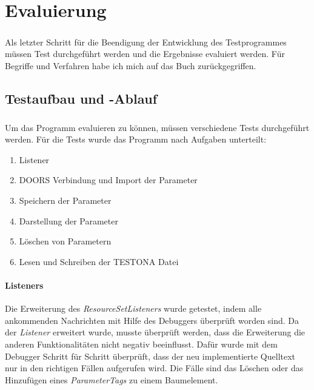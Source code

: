 \chapter{Evaluierung}\label{chp:Evaluierung}
\paragraph{}

Als letzter Schritt für die Beendigung der Entwicklung des Testprogrammes müssen Test durchgeführt werden und die Ergebnisse evaluiert werden. Für Begriffe und Verfahren habe ich mich auf das Buch \cite{TestenInfoSys} zurückgegriffen.


\newpage
\section{Testaufbau und -Ablauf} \label{sec:test}
\paragraph{}
Um das Programm evaluieren zu können, müssen verschiedene Tests durchgeführt werden. Für die Tests wurde das Programm nach Aufgaben unterteilt:

\begin{enumerate}
\item Listener
\item DOORS Verbindung und Import der Parameter
\item Speichern der Parameter
\item Darstellung der Parameter
\item Löschen von Parametern
\item Lesen und Schreiben der TESTONA Datei
\end{enumerate}


\subsubsection{Listeners}
Die Erweiterung des \textit{ResourceSetListeners} wurde getestet, indem alle ankommenden Nachrichten mit Hilfe des Debuggers überprüft worden sind. Da der \textit{Listener} erweitert wurde, musste überprüft werden, dass die Erweiterung die anderen Funktionalitäten nicht negativ beeinflusst. Dafür wurde mit dem Debugger Schritt für Schritt überprüft, dass der neu implementierte Quelltext nur in den richtigen Fällen aufgerufen wird. Die Fälle sind das Löschen oder das Hinzufügen eines \textit{ParameterTags} zu einem Baumelement.\\



